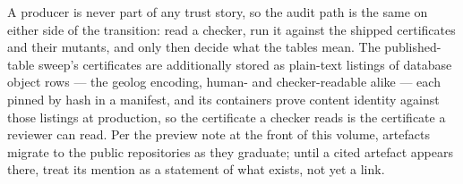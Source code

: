 A producer is never part of any trust story, so the audit path is the
same on either side of the transition: read a checker, run it against
the shipped certificates and their mutants, and only then decide what
the tables mean. The published-table sweep's certificates are
additionally stored as plain-text listings of database object rows
--- the geolog encoding, human- and checker-readable alike --- each
pinned by hash in a manifest, and its containers prove content
identity against those listings at production, so the certificate a
checker reads is the certificate a reviewer can read. Per the preview
note at the front of this volume, artefacts migrate to the public
repositories as they graduate; until a cited artefact appears there,
treat its mention as a statement of what exists, not yet a link.
